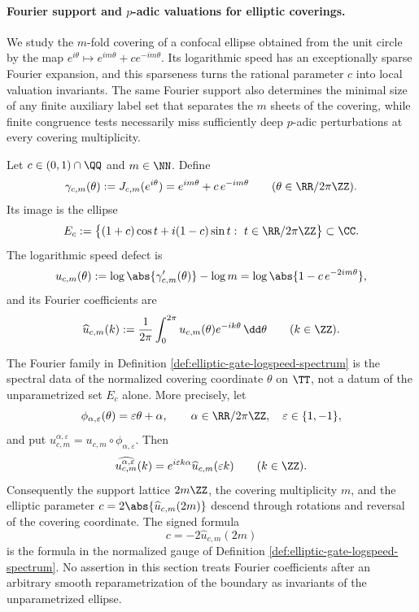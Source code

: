 \paragraph{Fourier support and \(p\)-adic valuations for elliptic coverings.}
We study the \(m\)-fold covering of a confocal ellipse obtained from the unit circle by the map \(e^{i\theta}\mapsto e^{im\theta}+c e^{-im\theta}\). Its logarithmic speed has an exceptionally sparse Fourier expansion, and this sparseness turns the rational parameter \(c\) into local valuation invariants. The same Fourier support also determines the minimal size of any finite auxiliary label set that separates the \(m\) sheets of the covering, while finite congruence tests necessarily miss sufficiently deep \(p\)-adic perturbations at every covering multiplicity.

\begin{definition}\label{def:elliptic-gate-logspeed-spectrum}
Let \(c\in(0,1)\cap\QQ\) and \(m\in\NN\). Define
\[
\gamma_{c,m}(\theta):=J_{c,m}(e^{i\theta})=e^{im\theta}+c\,e^{-im\theta}
\qquad (\theta\in\RR/2\pi\ZZ).
\]
Its image is the ellipse
\[
E_c:=\bigl\{(1+c)\cos t+i(1-c)\sin t:\ t\in\RR/2\pi\ZZ\bigr\}\subset\CC.
\]
The logarithmic speed defect is
\[
u_{c,m}(\theta):=\log\abs{\gamma_{c,m}'(\theta)}-\log m
=\log\abs{1-c\,e^{-2im\theta}},
\]
and its Fourier coefficients are
\[
\widehat u_{c,m}(k):=\frac{1}{2\pi}\int_{0}^{2\pi}u_{c,m}(\theta)e^{-ik\theta}\,\dd\theta
\qquad (k\in\ZZ).
\]
\end{definition}

\begin{lemma}\label{lem:elliptic-gate-parametrized-gauge}
The Fourier family in Definition \ref{def:elliptic-gate-logspeed-spectrum} is the spectral data of the normalized covering coordinate \(\theta\) on \(\TT\), not a datum of the unparametrized set \(E_c\) alone.  More precisely, let
\[
\phi_{\alpha,\varepsilon}(\theta)=\varepsilon\theta+\alpha,
\qquad
\alpha\in\RR/2\pi\ZZ,
\quad \varepsilon\in\{1,-1\},
\]
and put \(u^{\alpha,\varepsilon}_{c,m}=u_{c,m}\circ\phi_{\alpha,\varepsilon}\).  Then
\[
\widehat{u^{\alpha,\varepsilon}_{c,m}}(k)
=e^{i\varepsilon k\alpha}\widehat u_{c,m}(\varepsilon k)
\qquad (k\in\ZZ).
\]
Consequently the support lattice \(2m\ZZ\), the covering multiplicity \(m\), and the elliptic parameter \(c=2\abs{\widehat u_{c,m}(2m)}\) descend through rotations and reversal of the covering coordinate.  The signed formula
\[
c=-2\widehat u_{c,m}(2m)
\]
is the formula in the normalized gauge of Definition \ref{def:elliptic-gate-logspeed-spectrum}.  No assertion in this section treats Fourier coefficients after an arbitrary smooth reparametrization of the boundary as invariants of the unparametrized ellipse.
\end{lemma}


